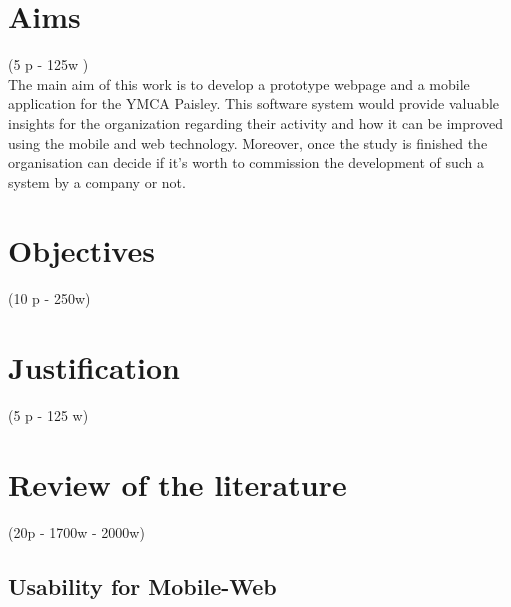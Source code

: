 \documentclass[version=last,fontsize=13pt]{scrartcl}
\begin{document}
\section{Aims}(5 p - 125w )\\
The main aim of this work is to develop a prototype webpage and a mobile application for the YMCA Paisley. This software system would provide valuable insights for the organization regarding their activity and how it can be improved using the mobile and web technology. Moreover, once the study is finished the organisation can decide if it's worth to commission the development of such a system by a company or not. 

\section{Objectives}(10 p - 250w)\\

\section{Justification}(5 p - 125 w)\\

\pagebreak

\section{Review of the literature } (20p - 1700w - 2000w)\\

\subsection{Usability for Mobile-Web}
\end{document}
